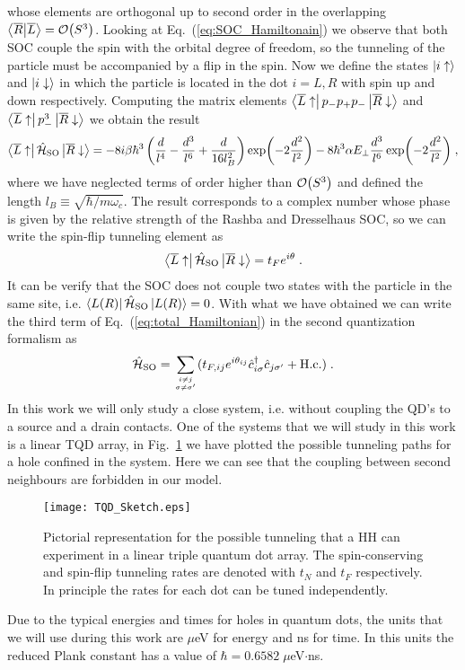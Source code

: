 whose elements are orthogonal up to second order in the overlapping $\braket{\overline{R}}{\overline{L}}=\order{S^3}$. Looking at Eq.~(\ref{eq:SOC_Hamiltonain}) we observe that both SOC couple the spin with the orbital degree of freedom, so the tunneling of the particle must be accompanied by a flip in the spin. Now we define the states $\ket{i\uparrow}$ and $\ket{i\downarrow}$ in which the particle is located in the dot $i=L,R$ with spin up and down respectively. Computing the matrix elements $\bra{\overline{L}\uparrow}p_-p_+p_-\ket{\overline{R}\downarrow}$ and $\bra{\overline{L}\uparrow}p_-^3\ket{\overline{R}\downarrow}$ we obtain the result
\begin{equation}
	\bra{\overline{L}\uparrow}\hat{\mathcal{H}}_{\text{SO}}\ket{\overline{R}\downarrow}=-8i\beta\hbar^3\left(\frac{d}{l^4}-\frac{d^3}{l^6}+\frac{d}{16l_B^2}\right)\exp(-2\frac{d^2}{l^2})-8\hbar^3\alpha E_\perp \frac{d^3}{l^6}\exp(-2\frac{d^2}{l^2})\; ,
\end{equation}
where we have neglected terms of order higher than $\order{S^3}$ and defined the length $l_B\equiv \sqrt{\hbar/m\omega_c}$. The result corresponds to a complex number whose phase is given by the relative strength of the Rashba and Dresselhaus SOC, so we can write the spin-flip tunneling element as
\begin{equation}
	\bra{\overline{L}\uparrow}\hat{\mathcal{H}}_{\text{SO}}\ket{\overline{R}\downarrow}=t_Fe^{i\theta}\; .
\end{equation}
It can be verify that the SOC does not couple two states with the particle in the same site, i.e. $\bra{L (R)}\hat{\mathcal{H}}_{\text{SO}}\ket{L (R)}=0$. With what we have obtained we can write the third term of Eq.~(\ref{eq:total_Hamiltonian}) in the second quantization formalism as
\begin{equation}
	\hat{\mathcal{H}}_{\text{SO}}=\sum_{i\neq j\atop \sigma\neq\sigma'}(t_{F,ij}e^{i\theta_{ij}}\hat{c}^\dagger_{i\sigma}\hat{c}_{j\sigma'}+\text{H.c.} )\; .
\end{equation}
In this work we will only study a close system, i.e. without coupling the QD's to a source and a drain contacts. One of the systems that we will study in this work is a linear TQD array, in Fig.~\ref{fig:TQD_Sketch} we have plotted the possible tunneling paths for a hole confined in the system. Here we can see that the coupling between second neighbours are forbidden in our model.
\begin{figure}[!htbp]
	\centering
	\texttt{[image: TQD\_Sketch.eps]}
	\caption{Pictorial representation for the possible tunneling that a HH can experiment in a linear triple quantum dot array. The spin-conserving and spin-flip tunneling rates are denoted with $t_N$ and $t_F$ respectively. In principle the rates for each dot can be tuned independently.}
	\label{fig:TQD_Sketch}
\end{figure}

Due to the typical energies and times for holes in quantum dots, the units that we will use during this work are $\mu$eV for energy and ns for time. In this units the reduced Plank constant has a value of $\hbar=0.6582 \; \mu$eV$\cdot$ns.


